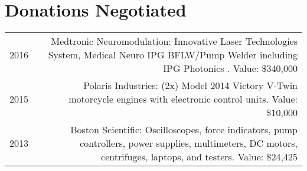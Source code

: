 \section*{Donations Negotiated}
\begin{tabular}{L!{\VRule}R}
2016&Medtronic Neuromodulation: Innovative Laser Technologies System, Medical Neuro IPG BFLW/Pump Welder including IPG Photonics . Value: \$340,000\\
2015&Polaris Industries: (2x) Model 2014 Victory V-Twin motorcycle engines with electronic control units. Value: \$10,000\\
2013&Boston Scientific: Oscilloscopes, force indicators, pump controllers, power supplies, multimeters, DC motors, centrifuges, laptops, and testers. Value: \$24,425\\
\end{tabular}